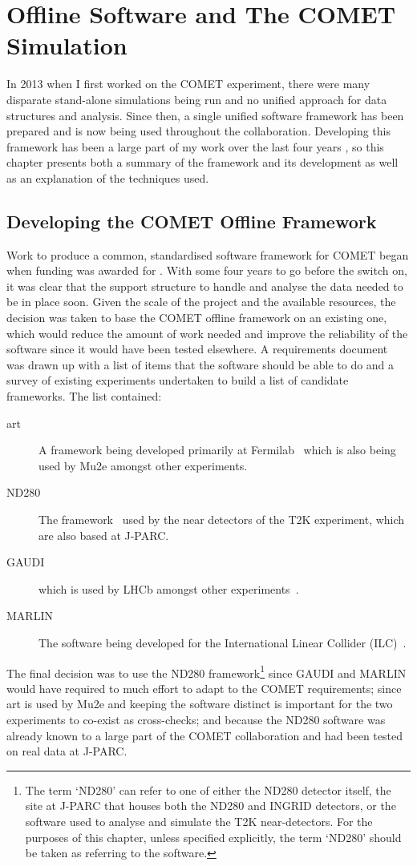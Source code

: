 
\chapter{Offline Software and The COMET Simulation}
In 2013 when I first worked on the COMET experiment, there were many disparate stand-alone simulations being run and no unified approach for data structures and analysis.
Since then, a single unified software framework has been prepared and is now being used throughout the collaboration.
Developing this framework has been a large part of my work over the last four years
, so this chapter presents both a summary of the framework and its development as well as an explanation of the techniques used.

\section{Developing the COMET Offline Framework}
Work to produce a common, standardised software framework for COMET began when funding was awarded for \phaseI.
With some four years to go before the switch on, it was clear that the support structure to handle and analyse the data needed to be in place soon.
Given the scale of the project and the available resources, the decision was taken to base the COMET offline framework on an existing one, which would reduce the amount of work needed and improve the reliability of the software since it would have been tested elsewhere.
A requirements document~\cite{COMETSoftwareRequirements} was drawn up with a list of items that the software should be able to do and a survey of existing experiments undertaken to build a list of candidate frameworks.
The list contained:
\begin{description}
\item [art] A framework being developed primarily at Fermilab~\cite{art:2011} which is also being used by Mu2e amongst other experiments.
\item [ND280] The framework~\cite{T2K:nim} used by the near detectors of the T2K experiment, which are also based at J-PARC.
\item [GAUDI] which is used by LHCb amongst other experiments~\cite{gaudi:2001}.
\item [MARLIN] The software being developed for the International Linear Collider (ILC)~\cite{marlin:web}.
\end{description}

The final decision was to use the ND280 framework\footnote{The term `ND280' can
refer to one of either the ND280 detector itself, the site at J-PARC that
houses both the ND280 and INGRID detectors, or the software used to analyse and
simulate the T2K near-detectors.  For the purposes of this chapter, unless
specified explicitly, the term `ND280' should be taken as referring to the
software.} 
since GAUDI and MARLIN would have required to much effort to adapt to the COMET
requirements; since art is used by Mu2e and keeping the software distinct is
important for the two experiments to co-exist as cross-checks; and because the
ND280 software was already known to a large part of the COMET collaboration and
had been tested on real data at J-PARC.

